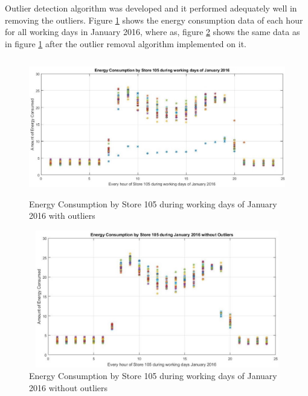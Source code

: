 \documentclass[conference]{IEEEtran}
\begin{document}
Outlier detection algorithm was developed and it performed adequately well in removing the outliers. Figure \ref{fig:OLX} shows the energy consumption data of each hour for all working days in January 2016, where as, figure \ref{fig:OLX1} shows the
same data as in figure \ref{fig:OLX} after the outlier removal algorithm implemented
on it.
\begin{figure}[h]
	\centering
	\includegraphics[width=13cm,height=6cm]{with_OL.jpg}
	\caption{Energy Consumption by Store 105 during working days of January
		2016 with outliers}
	\label{fig:OLX}
\end{figure}
\begin{figure}[h]
	\centering
	\includegraphics[width=13cm,height=6cm]{without_OL.jpg}
	\caption{Energy Consumption by Store 105 during working days of January
		2016 without outliers}
	\label{fig:OLX1}
\end{figure}
\end{document}
